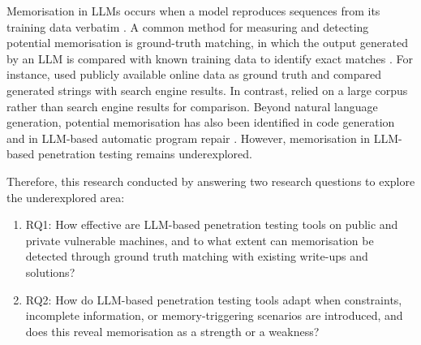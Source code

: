 \documentclass[acmtog]{acmart}
\begin{document}
Memorisation in LLMs occurs when a model reproduces sequences from its training data verbatim \cite{biderman_emergent_2023}. A common method for measuring and detecting potential memorisation is ground-truth matching, in which the output generated by an LLM is compared with known training data to identify exact matches \cite{carlini_secret_2019,carlini_extracting_2021}. For instance, \citet{carlini_extracting_2021} used publicly available online data as ground truth and compared generated strings with search engine results. In contrast, \citet{nasr_scalable_2023} relied on a large corpus rather than search engine results for comparison. Beyond natural language generation, potential memorisation has also been identified in code generation \cite{chen_memorize_2025} and in LLM-based automatic program repair \cite{kong_demystifying_2025}. However, memorisation in LLM-based penetration testing remains underexplored.

Therefore, this research conducted by answering two research questions to explore the underexplored area:
\begin{enumerate}
  \item RQ1: How effective are LLM-based penetration testing tools on public and private vulnerable machines, and to what extent can memorisation be detected through ground truth matching with existing write-ups and solutions?
  \item RQ2: How do LLM-based penetration testing tools adapt when constraints, incomplete information, or memory-triggering scenarios are introduced, and does this reveal memorisation as a strength or a weakness?
\end{enumerate}
\end{document}
